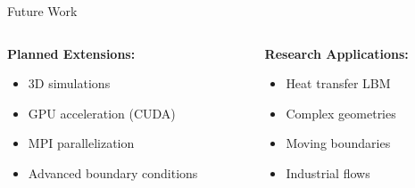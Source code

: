 \documentclass{beamer}
\begin{document}
\begin{frame}{Future Work}
  \begin{columns}
    \begin{column}{0.5\textwidth}
      \textbf{Planned Extensions:}
      \begin{itemize}
        \item 3D simulations
        \item GPU acceleration (CUDA)
        \item MPI parallelization
        \item Advanced boundary conditions
      \end{itemize}
    \end{column}
    \begin{column}{0.5\textwidth}
      \textbf{Research Applications:}
      \begin{itemize}
        \item Heat transfer LBM
        \item Complex geometries
        \item Moving boundaries
        \item Industrial flows
      \end{itemize}
    \end{column}
  \end{columns}
\end{frame}
\end{document}
